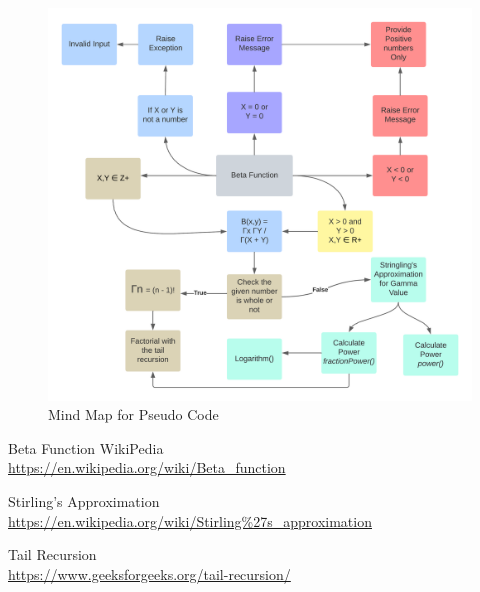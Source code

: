 \documentclass[a4paper, 12pt]{article}
\begin{document}
\begin{figure}[h]
    \centering
    \begin{center}
    \includegraphics[width=1.0\linewidth]{Images/Mind-Map.png}    
    \end{center}
    \caption{Mind Map for Pseudo Code}
    \label{fig:Mind Map}
\end{figure}


\newpage

\begin{thebibliography}{15}

Beta Function WikiPedia
\\\href{https://en.wikipedia.org/wiki/Beta\_function}{https://en.wikipedia.org/wiki/Beta\_function}

Stirling's Approximation
\\\href{https://en.wikipedia.org/wiki/Stirling\%27s\_approximation}{https://en.wikipedia.org/wiki/Stirling\%27s\_approximation}

Tail Recursion
\\\href{https://www.geeksforgeeks.org/tail-recursion/}{https://www.geeksforgeeks.org/tail-recursion/}

\end{thebibliography}
\end{document}
